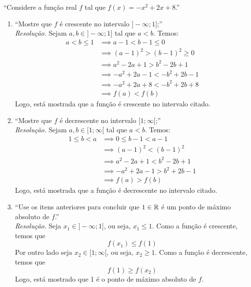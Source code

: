 \enquote{Considere a função real $f$ tal que $f(x) = -x^2 + 2x + 8$.}
\begin{enumerate}
    \item \enquote{Mostre que $f$ é crescente no intervalo $]-\infty; 1]$;} \\
    \emph{Resolução.} Sejam $a, b \in ]-\infty; 1]$ tal que $a < b$. Temos:
    \begin{align*}
        a < b \le 1 & \implies a - 1 < b - 1 \le 0 \\ & \implies
        (a - 1)^2 > (b - 1)^2 \ge 0 \\ & \implies
        a^2 - 2a + 1 > b^2 - 2b + 1 \\ & \implies
        -a^2 + 2a - 1 < -b^2 + 2b - 1 \\ & \implies
        -a^2 + 2a + 8 < -b^2 + 2b + 8 \\ & \implies
        f(a) < f(b)
    \end{align*}
    Logo, está mostrada que a função é crescente no intervalo citado.
    \item \enquote{Mostre que $f$ é decrescente no intervalo $[1; \infty[$;} \\
    \emph{Resolução.} Sejam $a, b \in [1; \infty[$ tal que $a < b$. Temos:
    \begin{align*}
        1 \le b < a & \implies 0 \le b - 1 < a - 1 \\ & \implies
        (a - 1)^2 < (b - 1)^2 \\ & \implies
        a^2 - 2a + 1 < b^2 - 2b + 1 \\ & \implies
        -a^2 + 2a - 1 > b^2 + 2b - 1 \\ & \implies
        f(a) > f(b)
    \end{align*}
    Logo, está mostrada que a função é decrescente no intervalo citado.
    \item \enquote{Use os itens anteriores para concluir que $1 \in \mathbb R$ é um ponto de máximo absoluto de $f$.} \\
    \emph{Resolução.} Seja $x_1 \in ]-\infty; 1]$, ou seja, $x_1 \le 1$. Como a função é crescente, temos que
    \begin{displaymath}
        f(x_1) \le f(1)
    \end{displaymath}
    Por outro lado seja $x_2 \in [1; \infty[$, ou seja, $x_2 \ge 1$. Como a função é decrescente, temos que
    \begin{displaymath}
        f(1) \ge f(x_2)
    \end{displaymath}
    Logo, está mostrado que 1 é o ponto de máximo absoluto de $f$.
\end{enumerate}